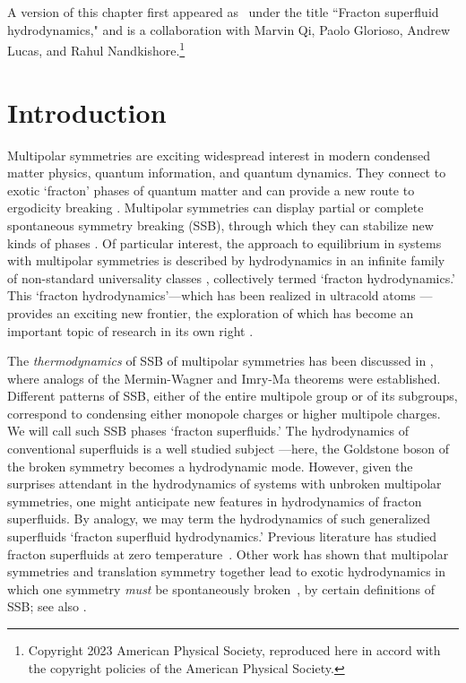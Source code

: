 A version of this chapter first appeared as~\cite{Stahl2023Fracton} under the title ``Fracton superfluid hydrodynamics," and is a collaboration with Marvin Qi, Paolo Glorioso, Andrew Lucas, and Rahul Nandkishore.\footnote{Copyright 2023 American Physical Society, reproduced here in accord with the copyright policies of the American Physical Society.}



\section{Introduction}

Multipolar symmetries are exciting widespread interest in modern condensed matter physics, quantum information, and quantum dynamics. They connect to exotic `fracton' phases of quantum matter \cite{Pretko2017Subdimensional, Gromov2019Multipole} and can provide a new route to ergodicity breaking \cite{Pai2019Localization, Khemani2020Localization, Sala2020Fragmentation}. Multipolar symmetries can display partial or complete spontaneous symmetry breaking (SSB), through which they can stabilize new kinds of phases \cite{Lake2022Dipolar}. Of particular interest, the approach to equilibrium in systems with multipolar symmetries is described by hydrodynamics in an infinite family of non-standard universality classes \cite{NandkishoreHermele2019, Iaconis2019Subdiffusion}, collectively termed `fracton hydrodynamics.' This `fracton hydrodynamics'---which has been realized in ultracold atoms \cite{GuardadoSanchez2020}---provides an exciting new frontier, the exploration of which has become an important topic of research in its own right \cite{Glorioso2022Breakdown, RichterPal2022, Iaconis2021Multipole, Glorioso2021Nonabelian, Grosvenor2021Hydrodynamics, Osborne2021FractonFluids, Feldmeier2020Anomalous, Sala2022Modulated, Hart2022Quasiconservation, Qi2023FractonMHD, Guo2022Fracton, Glorioso2023Goldstone}. 

The {\it thermodynamics} of SSB of multipolar symmetries has been discussed in \cite{Stahl2022Spontaneous, Kapustin2022Hohenberg}, where analogs of the Mermin-Wagner and Imry-Ma theorems were established. Different patterns of SSB, either of the entire multipole group or of its subgroups, correspond to condensing either monopole charges or higher multipole charges. We will call such SSB phases `fracton superfluids.'
The hydrodynamics of conventional superfluids is a well studied subject \cite{Putterman1974SF}---here, the Goldstone boson of the broken symmetry becomes a hydrodynamic mode. However, given the surprises attendant in the  hydrodynamics of systems with unbroken multipolar symmetries, one might anticipate new features in hydrodynamics of fracton superfluids. By analogy, we may term the hydrodynamics of such generalized superfluids `fracton superfluid hydrodynamics.' Previous literature has studied fracton superfluids at zero temperature~\cite{Yuan2020Fractonic, Lake2022Dipolar}. 
Other work has shown that multipolar symmetries and translation symmetry together lead to exotic hydrodynamics in which one symmetry \emph{must} be spontaneously broken~\cite{Glorioso2023Goldstone}, by certain definitions of SSB; see also \cite{Jensen2022Large}. 

